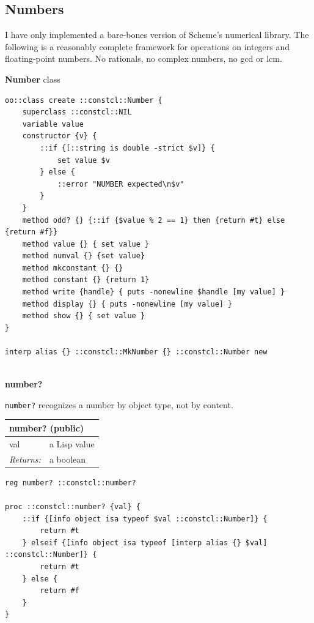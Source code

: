 \documentclass[twoside,9pt]{report}
\begin{document}
\subsection{Numbers}
\label{numbers}

I have only implemented a bare-bones version of Scheme's numerical library. The following is a reasonably complete framework for operations on integers and floating-point numbers. No rationals, no complex numbers, no gcd or lcm.


\textbf{Number} class

\noindent\makebox[\linewidth]{\rule{\linewidth}{0.4pt}}
\begin{lstlisting}
oo::class create ::constcl::Number {
    superclass ::constcl::NIL
    variable value
    constructor {v} {
        ::if {[::string is double -strict $v]} {
            set value $v
        } else {
            ::error "NUMBER expected\n$v"
        }
    }
    method odd? {} {::if {$value % 2 == 1} then {return #t} else {return #f}}
    method value {} { set value }
    method numval {} {set value}
    method mkconstant {} {}
    method constant {} {return 1}
    method write {handle} { puts -nonewline $handle [my value] }
    method display {} { puts -nonewline [my value] }
    method show {} { set value }
}
 
interp alias {} ::constcl::MkNumber {} ::constcl::Number new
 
\end{lstlisting}
\noindent\makebox[\linewidth]{\rule{\linewidth}{0.4pt}}

\textbf{number?}


\texttt{number?} recognizes a number by object type, not by content.

\begin{tabular}{ |l l| }
\hline
\multicolumn{2}{|l|}{number? (public)} \\
\hline
val & a Lisp value \\
\textit{Returns:} & a boolean \\
\hline
\end{tabular}

\noindent\makebox[\linewidth]{\rule{\linewidth}{0.4pt}}
\begin{lstlisting}
reg number? ::constcl::number?
 
proc ::constcl::number? {val} {
    ::if {[info object isa typeof $val ::constcl::Number]} {
        return #t
    } elseif {[info object isa typeof [interp alias {} $val] ::constcl::Number]} {
        return #t
    } else {
        return #f
    }
}
\end{lstlisting}
\noindent\makebox[\linewidth]{\rule{\linewidth}{0.4pt}}
\end{document}
